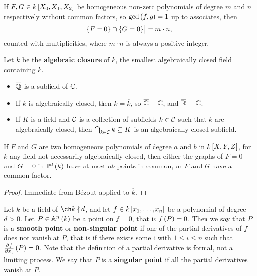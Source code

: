 \pagebreak

\begin{theorem}
If $ F, G \in k\sbr{X_0, X_1, X_2} $ be homogeneous non-zero polynomials of degree $ m $ and $ n $ respectively without common factors, so $ \gcd\br{f, g} = 1 $ up to associates, then
$$ \abs{\cbr{F = 0} \cap \cbr{G = 0}} = m \cdot n, $$
counted with multiplicities, where $ m \cdot n $ is always a positive integer.
\end{theorem}

Let $ \overline{k} $ be the \textbf{algebraic closure} of $ k $, the smallest algebraically closed field containing $ k $.

\begin{example*}
\hfill
\begin{itemize}
\item $ \overline{\mathbb{Q}} $ is a subfield of $ \mathbb{C} $.
\item If $ k $ is algebraically closed, then $ k = \overline{k} $, so $ \overline{\mathbb{C}} = \mathbb{C} $, and $ \overline{\mathbb{R}} = \mathbb{C} $.
\item If $ K $ is a field and $ \mathcal{C} $ is a collection of subfields $ k \in \mathcal{C} $ such that $ k $ are algebraically closed, then $ \bigcap_{k \in \mathcal{C}} k \subseteq K $ is an algebraically closed subfield.
\end{itemize}
\end{example*}

\begin{corollary}
If $ F $ and $ G $ are two homogeneous polynomials of degree $ a $ and $ b $ in $ k\sbr{X, Y, Z} $, for $ k $ any field not necessarily algebraically closed, then either the graphs of $ F = 0 $ and $ G = 0 $ in $ \PP^2\br{k} $ have at most $ ab $ points in common, or $ F $ and $ G $ have a common factor.
\end{corollary}

\begin{proof}
Immediate from B\'ezout applied to $ \overline{k} $.
\end{proof}

\begin{definition}
Let $ k $ be a field of $ \ch k \nmid d $, and let $ f \in k\sbr{x_1, \dots, x_n} $ be a polynomial of degree $ d > 0 $. Let $ P \in \AA^n\br{k} $ be a point on $ f = 0 $, that is $ f\br{P} = 0 $. Then we say that $ P $ is a \textbf{smooth point} or \textbf{non-singular point} if one of the partial derivatives of $ f $ does not vanish at $ P $, that is if there exists some $ i $ with $ 1 \le i \le n $ such that $ \tpd{f}{x_i}\br{P} = 0 $. Note that the definition of a partial derivative is formal, not a limiting process. We say that $ P $ is a \textbf{singular point} if all the partial derivatives vanish at $ P $.
\end{definition}

